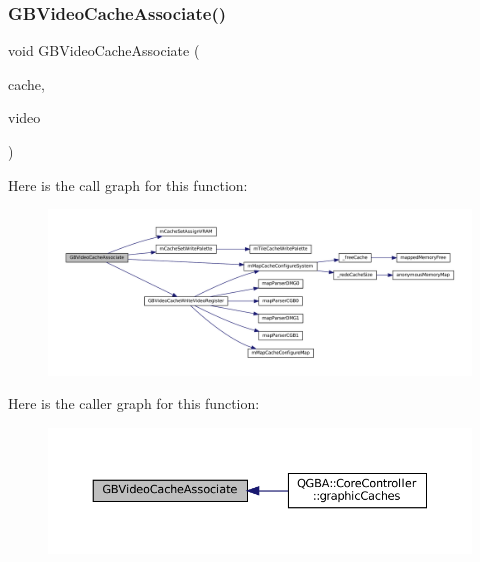\subsubsection{\texorpdfstring{G\+B\+Video\+Cache\+Associate()}{GBVideoCacheAssociate()}}
{\footnotesize\ttfamily void G\+B\+Video\+Cache\+Associate (\begin{DoxyParamCaption}\item[{struct m\+Cache\+Set $\ast$}]{cache,  }\item[{struct G\+B\+Video $\ast$}]{video }\end{DoxyParamCaption})}

Here is the call graph for this function\+:
\nopagebreak
\begin{figure}[H]
\begin{center}
\leavevmode
\includegraphics[width=350pt]{gb_2renderers_2cache-set_8c_ab2420f444ebe87f2f01729e2a3f66e37_cgraph}
\end{center}
\end{figure}
Here is the caller graph for this function\+:
\nopagebreak
\begin{figure}[H]
\begin{center}
\leavevmode
\includegraphics[width=350pt]{gb_2renderers_2cache-set_8c_ab2420f444ebe87f2f01729e2a3f66e37_icgraph}
\end{center}
\end{figure}
\mbox{\label{gb_2renderers_2cache-set_8c_ae7e228e583d5f680af631188c85bdf5e}} 
